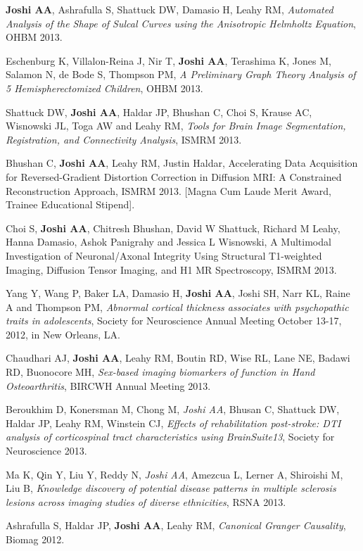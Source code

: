 \documentclass[overlapped,line,letterpaper]{res}
\begin{document}
\begin{resume}
\textbf{Joshi AA}, Ashrafulla S, Shattuck DW, Damasio H, Leahy RM, \textit{Automated Analysis of the Shape of Sulcal Curves using the Anisotropic Helmholtz Equation}, OHBM 2013.

Eschenburg K, Villalon-Reina J, Nir T, \textbf{Joshi AA}, Terashima K, Jones M, Salamon N, de Bode S, Thompson PM, \textit{A Preliminary Graph Theory Analysis of 5 Hemispherectomized Children}, OHBM 2013.

Shattuck DW, \textbf{Joshi AA}, Haldar JP, Bhushan C, Choi S, Krause AC, Wisnowski JL, Toga AW and Leahy RM, \textit{Tools for Brain Image Segmentation, Registration, and Connectivity Analysis}, ISMRM 2013. 

Bhushan C, \textbf{Joshi AA}, Leahy RM, Justin Haldar, Accelerating Data Acquisition for Reversed-Gradient Distortion Correction in Diffusion MRI: A Constrained Reconstruction Approach, ISMRM 2013. [Magna Cum Laude Merit Award, Trainee Educational Stipend].

Choi S, \textbf{Joshi AA}, Chitresh Bhushan, David W Shattuck, Richard M Leahy, Hanna Damasio, Ashok Panigrahy and Jessica L Wisnowski, A Multimodal Investigation of Neuronal/Axonal Integrity Using Structural T1-weighted Imaging, Diffusion Tensor Imaging, and H1 MR Spectroscopy, ISMRM 2013.

Yang Y, Wang P, Baker LA, Damasio H, \textbf{Joshi AA}, Joshi SH, Narr KL, Raine A and Thompson PM, \textit{Abnormal cortical thickness associates with psychopathic traits in adolescents}, Society for Neuroscience Annual Meeting October 13-17, 2012, in New Orleans, LA.

Chaudhari AJ, \textbf{Joshi AA}, Leahy RM, Boutin RD, Wise RL, Lane NE, Badawi RD, Buonocore MH, \textit{Sex-based imaging biomarkers of function in Hand Osteoarthritis}, BIRCWH Annual Meeting 2013.

Beroukhim D, Konersman M, Chong M, \textit{Joshi AA}, Bhusan C, Shattuck DW, Haldar JP, Leahy RM, Winstein CJ, \textit{Effects of rehabilitation post-stroke: DTI analysis of corticospinal tract characteristics using BrainSuite13}, Society for Neuroscience 2013.

Ma K, Qin Y, Liu Y, Reddy N, \textit{Joshi AA}, Amezcua L, Lerner A, Shiroishi M, Liu B, \textit{Knowledge discovery of potential disease patterns in multiple sclerosis lesions across imaging studies of diverse ethnicities}, RSNA 2013.

Ashrafulla S, Haldar JP, \textbf{Joshi AA}, Leahy RM, \textit{Canonical Granger Causality}, Biomag 2012.


\end{resume}
\end{document}
